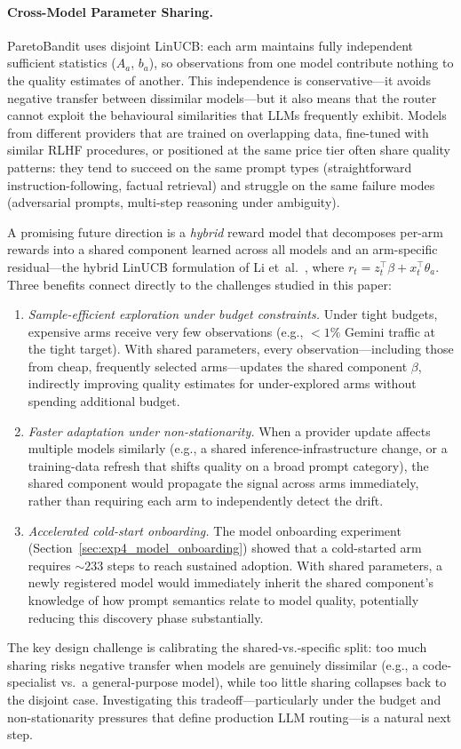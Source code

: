 \paragraph{Cross-Model Parameter Sharing.}
ParetoBandit uses disjoint LinUCB: each arm maintains fully independent sufficient statistics ($A_a$, $b_a$), so observations from one model contribute nothing to the quality estimates of another.
This independence is conservative---it avoids negative transfer between dissimilar models---but it also means that the router cannot exploit the behavioural similarities that LLMs frequently exhibit.
Models from different providers that are trained on overlapping data, fine-tuned with similar RLHF procedures, or positioned at the same price tier often share quality patterns: they tend to succeed on the same prompt types (straightforward instruction-following, factual retrieval) and struggle on the same failure modes (adversarial prompts, multi-step reasoning under ambiguity).

A promising future direction is a \emph{hybrid} reward model that decomposes per-arm rewards into a shared component learned across all models and an arm-specific residual---the hybrid LinUCB formulation of Li et~al.~\cite{li2010contextual}, where $r_t = z_t^\top \beta + x_t^\top \theta_a$.
Three benefits connect directly to the challenges studied in this paper:
\begin{enumerate}[nosep,leftmargin=*]
  \item \emph{Sample-efficient exploration under budget constraints.}
    Under tight budgets, expensive arms receive very few observations (e.g., $<1\%$ Gemini traffic at the tight target).
    With shared parameters, every observation---including those from cheap, frequently selected arms---updates the shared component $\beta$, indirectly improving quality estimates for under-explored arms without spending additional budget.
  \item \emph{Faster adaptation under non-stationarity.}
    When a provider update affects multiple models similarly (e.g., a shared inference-infrastructure change, or a training-data refresh that shifts quality on a broad prompt category), the shared component would propagate the signal across arms immediately, rather than requiring each arm to independently detect the drift.
  \item \emph{Accelerated cold-start onboarding.}
    The model onboarding experiment (Section~\ref{sec:exp4_model_onboarding}) showed that a cold-started arm requires ${\sim}233$ steps to reach sustained adoption.
    With shared parameters, a newly registered model would immediately inherit the shared component's knowledge of how prompt semantics relate to model quality, potentially reducing this discovery phase substantially.
\end{enumerate}
The key design challenge is calibrating the shared-vs.-specific split: too much sharing risks negative transfer when models are genuinely dissimilar (e.g., a code-specialist vs.\ a general-purpose model), while too little sharing collapses back to the disjoint case.
Investigating this tradeoff---particularly under the budget and non-stationarity pressures that define production LLM routing---is a natural next step.

